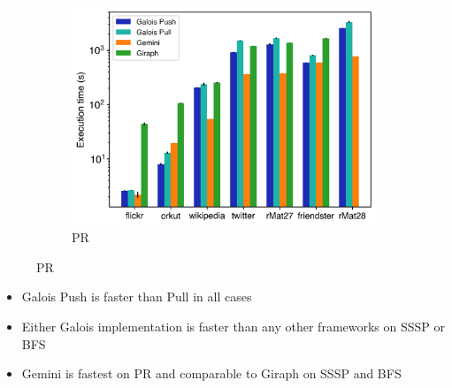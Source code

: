 \documentclass{meetings}
\begin{document}
\begin{figure}[h]
\begin{subfigure}{0.32\textwidth}
		\includegraphics[width=\linewidth]{../../plots/distributedPR_execTime.png}
		\caption{PR}
		\label{fig:distributedSSSP_exec}
	\end{subfigure}
\end{figure}
\begin{itemize}
	\item Galois Push is faster than Pull in all cases
	\item Either Galois implementation is faster than any other frameworks on SSSP or BFS
	\item Gemini is fastest on PR and comparable to Giraph on SSSP and BFS
\end{itemize}
\end{document}
